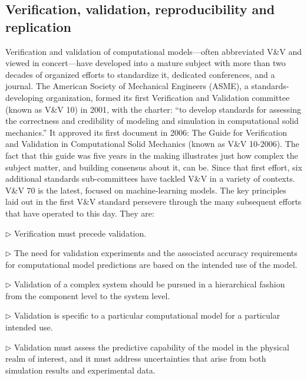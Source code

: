 
\subsection{Verification, validation, reproducibility and replication}

Verification and validation of computational models---often abbreviated V\&V and viewed in concert---have developed into a mature subject with more than two decades of organized efforts to standardize it, dedicated conferences, and a  journal. 
The American Society of Mechanical Engineers (ASME), a standards-developing organization, formed its first Verification and Validation committee (known as V\&V 10) in 2001, with the charter: 
``to develop standards for assessing the correctness and credibility of modeling and simulation in computational solid mechanics.''
It approved its first document in 2006: The Guide for Verification and Validation in Computational Solid Mechanics (known as V\&V 10-2006). 
The fact that this guide was five years in the making illustrates just how complex the subject matter, and building consensus about it, can be. 
Since that first effort, six additional standards sub-committees have tackled V\&V in a variety of contexts. 
V\&V 70 is the latest, focused on machine-learning models.
The key principles laid out in the first V\&V standard persevere through the many subsequent efforts that have operated to this day. 
They are:

\begin{compactitem}

\item[$\triangleright$] Verification must precede validation.
\item[$\triangleright$] The need for validation experiments and the associated accuracy requirements for computational model predictions are based on the intended use of the model.
\item[$\triangleright$] Validation of a complex system should be pursued in a hierarchical fashion from the component level to the system level.
\item[$\triangleright$] Validation is specific to a particular computational model for a particular intended use.
\item[$\triangleright$] Validation must assess the predictive capability of the model in the physical realm of interest, and it
must address uncertainties that arise from both simulation results and experimental data.

\end{compactitem}

